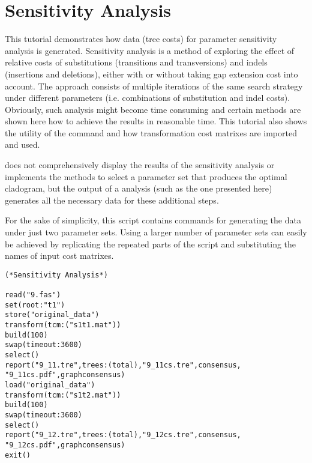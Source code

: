 
\section{Sensitivity Analysis}{\label{tutorial7}}

This tutorial demonstrates how data (tree costs) for parameter
sensitivity analysis is generated. Sensitivity analysis \cite{wheeler1995}
is a method of exploring the effect of relative costs of substitutions
(transitions and transversions) and indels (insertions and deletions),
either with or without taking gap extension cost into account. The
approach consists of multiple iterations of the same search strategy
under different parameters (i.e. combinations of substitution and
indel costs).  Obviously, such analysis might become time consuming
and certain methods are shown here how to achieve the results in
reasonable time. This tutorial also shows the utility of the command 
 and how transformation cost matrixes are 
imported and used.

\poy does not comprehensively display the results of the sensitivity
analysis or implements the methods to select a parameter set that
produces the optimal cladogram, but the output of a \poy analysis
(such as the one presented here) generates all the necessary data
for these additional steps.

For the sake of simplicity, this script contains commands for
generating the data under just two parameter  sets.  Using a larger
number of parameter sets can easily be achieved by replicating the
repeated parts of the script and substituting the names of input
cost matrixes.

\begin{verbatim}
(*Sensitivity Analysis*)

read("9.fas")
set(root:"t1")
store("original_data")
transform(tcm:("s1t1.mat"))
build(100)
swap(timeout:3600)
select()
report("9_11.tre",trees:(total),"9_11cs.tre",consensus,
"9_11cs.pdf",graphconsensus)
load("original_data")
transform(tcm:("s1t2.mat"))
build(100)
swap(timeout:3600)
select()
report("9_12.tre",trees:(total),"9_12cs.tre",consensus,
"9_12cs.pdf",graphconsensus)
exit()
\end{verbatim}

